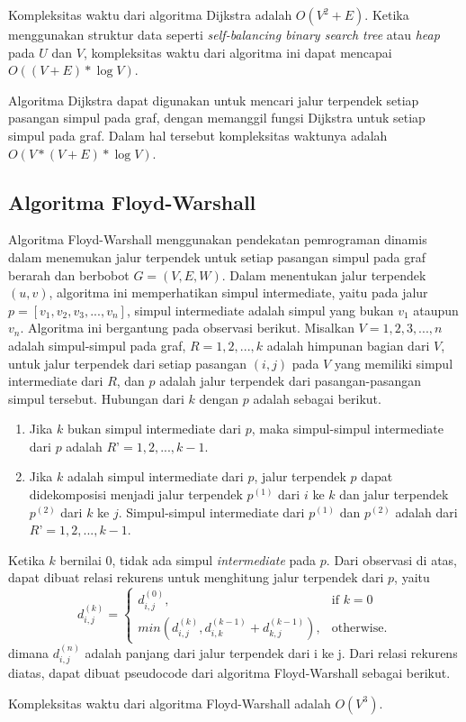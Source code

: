   \medskip
  

  Kompleksitas waktu dari algoritma Dijkstra adalah $O(V^{2} + E)$. Ketika menggunakan 
  struktur data seperti \textit{self-balancing binary search tree} atau \textit{heap} 
  pada $U$ dan $V$, kompleksitas waktu dari algoritma ini dapat mencapai 
  $O((V + E) * \log V)$.

  Algoritma Dijkstra dapat digunakan untuk mencari jalur terpendek setiap pasangan 
  simpul pada graf, dengan memanggil fungsi Dijkstra untuk setiap simpul pada graf. 
  Dalam hal tersebut kompleksitas waktunya adalah $O(V*(V + E)* \log V)$.

  \subsection{Algoritma Floyd-Warshall}
  Algoritma Floyd-Warshall menggunakan pendekatan pemrograman dinamis dalam menemukan 
  jalur terpendek untuk setiap pasangan simpul pada graf berarah dan berbobot 
  $G = (V, E, W)$. Dalam menentukan jalur terpendek $(u,v)$, algoritma ini 
  memperhatikan simpul intermediate, yaitu pada jalur 
  $p = [v_{1}, v_{2}, v_{3}, ..., v_{n}]$, simpul intermediate adalah simpul yang 
  bukan $v_{1}$ ataupun $v_{n}$. Algoritma ini bergantung pada observasi berikut. 
  Misalkan $V = {1, 2, 3, ..., n}$ adalah simpul-simpul pada graf, $R = {1, 2, ..., k}$ 
  adalah himpunan bagian dari $V$, untuk jalur terpendek dari setiap pasangan $(i, j)$ 
  pada $V$ yang memiliki simpul intermediate dari $R$, dan $p$ adalah jalur terpendek 
  dari pasangan-pasangan simpul tersebut. Hubungan dari $k$ dengan $p$ adalah sebagai 
  berikut.

  \begin{enumerate}
    \item Jika $k$ bukan simpul intermediate dari $p$, maka simpul-simpul intermediate dari $p$ adalah $R’ = {1, 2, ..., k-1}$.
    \item Jika $k$ adalah simpul intermediate dari $p$, jalur terpendek $p$ dapat didekomposisi menjadi jalur terpendek $p^{(1)}$ dari $i$ ke $k$ 
    dan jalur terpendek $p^{(2)}$ dari $k$ ke $j$. Simpul-simpul intermediate dari $p^{(1)}$ dan $p^{(2)}$ adalah dari $R’ = {1, 2, ..., k-1}$.
  \end{enumerate}

  Ketika $k$ bernilai 0, tidak ada simpul \textit{intermediate} pada $p$. Dari 
  observasi di atas, dapat dibuat relasi rekurens untuk menghitung jalur terpendek 
  dari $p$, yaitu
  \begin{equation}
    d_{i,j}^{(k)} =
    \begin{cases}
      d_{i,j}^{(0)}, & \text{if } k = 0\\
      min(d_{i,j}^{(k)}, d_{i,k}^{(k-1)} + d_{k,j}^{(k-1)}), & \text{otherwise}.
    \end{cases}
  \end{equation}
  dimana $d_{i,j}^{(n)}$ adalah panjang dari jalur terpendek dari i ke j. Dari relasi rekurens diatas, dapat dibuat pseudocode dari algoritma Floyd-Warshall sebagai berikut.

  \medskip
  

  Kompleksitas waktu dari algoritma Floyd-Warshall adalah $O(V^{3})$.

